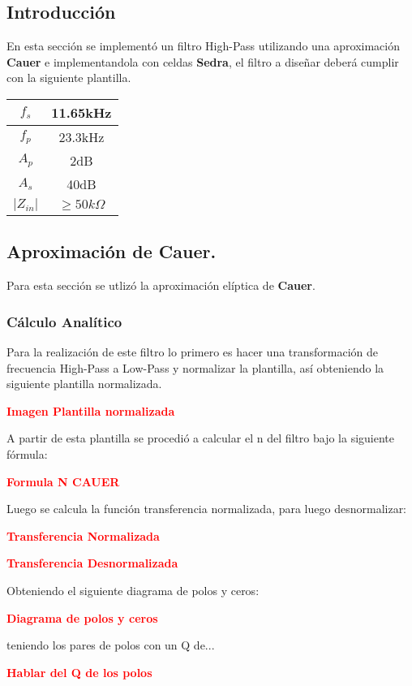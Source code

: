 


\subsection{Introducción}

En esta sección se implementó un filtro High-Pass utilizando una aproximación \textbf{Cauer} e implementandola con celdas \textbf{Sedra}, el filtro a diseñar deberá cumplir con la siguiente plantilla.
\begin{table}[H]
\centering
\begin{tabular}{|c|c|}
\hline
$f_s$      & 11.65kHz          \\ \hline
$f_p$      & 23.3kHz           \\ \hline
$A_p$      & 2dB               \\ \hline
$A_s$      & 40dB              \\ \hline
$|Z_{in}|$ & $\geq 50k \Omega$ \\ \hline
\end{tabular}
\end{table}
\subsection{Aproximación de Cauer.}
Para esta sección se utlizó la aproximación elíptica de \textbf{Cauer}.
\subsubsection{Cálculo Analítico}

Para la realización de este filtro lo primero es hacer una transformación de frecuencia High-Pass a Low-Pass y normalizar la plantilla, así obteniendo la siguiente plantilla normalizada.
\begin{center}
	\huge{\textcolor{red}{\textbf{Imagen Plantilla normalizada}}}
\end{center}
A partir de esta plantilla se procedió a calcular el n del filtro bajo la siguiente fórmula:
\begin{center}
	\huge{\textcolor{red}{\textbf{Formula N CAUER}}}
\end{center}
Luego se calcula la función transferencia normalizada, para luego desnormalizar:
\begin{center}
	\huge{\textcolor{red}{\textbf{Transferencia Normalizada}}}
\end{center}
\begin{center}
	\huge{\textcolor{red}{\textbf{Transferencia Desnormalizada}}}
\end{center}
Obteniendo el siguiente diagrama de polos y ceros:
\begin{center}
	\huge{\textcolor{red}{\textbf{Diagrama de polos y ceros}}}
\end{center}
teniendo los pares de polos con un Q de...
\begin{center}
	\huge{\textcolor{red}{\textbf{Hablar del Q de los polos}}}
\end{center}
